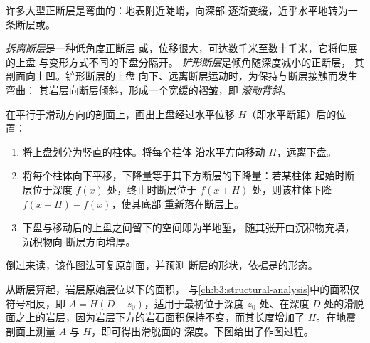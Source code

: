 许多大型正断层是弯曲的：地表附近陡峭，向深部
逐渐变缓，近乎水平地转为一条断层或。

\begin{definition}\label{def:b3:extension-strike-slip:detachment}
\emph{拆离断层}是一种低角度正断层
或，位移很大，可达数千米至数十千米，它将伸展的上盘
与变形方式不同的下盘分隔开。
\emph{铲形断层}是倾角随深度减小的正断层，
其剖面向上凹。铲形断层的上盘
向下、远离断层运动时，为保持与断层接触而发生弯曲：
其岩层向断层倾斜，形成一个宽缓的褶皱，即
\emph{滚动背斜}。
\end{definition}

\begin{method}[等水平断距作图法]\label{met:b3:extension-strike-slip:heave}
在平行于滑动方向的剖面上，画出上盘经过水平位移
$H$（即水平断距）后的位置：
\begin{enumerate}
  \item 将上盘划分为竖直的柱体。将每个柱体
        沿水平方向移动 $H$，远离下盘。
  \item 将每个柱体向下平移，下降量等于其下方断层的下降量：若某柱体
        起始时断层位于深度 $f(x)$ 处，终止时断层位于
        $f(x + H)$ 处，则该柱体下降 $f(x + H) - f(x)$，使其底部
        重新落在断层上。
  \item 下盘与移动后的上盘之间留下的空间即为半地堑，
        随其张开由沉积物充填，沉积物向
        断层方向增厚。
\end{enumerate}
倒过来读，该作图法可复原剖面，并预测
断层的形状，依据是的形态。
\end{method}

从断层算起，岩层原始层位以下的面积，
与\cref{ch:b3:structural-analysis}中的面积仅符号相反，即 $A =
H(D - z_0)$，适用于最初位于深度 $z_0$ 处、在深度
$D$ 处的滑脱面之上的岩层，因为岩层下方的岩石面积保持不变，而其长度增加了
$H$。在地震剖面上测量 $A$ 与 $H$，即可得出滑脱面的
深度。下图给出了作图过程。

